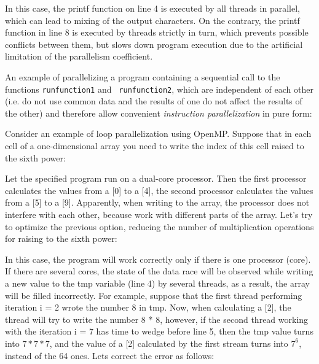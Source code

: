 {	\par In this case, the printf function on line 4 is executed by all threads in parallel, which can lead to mixing of the output characters. On the contrary, the printf function in line 8 is executed by threads strictly in turn, which prevents possible conflicts between them, but slows down program execution due to the artificial limitation of the parallelism coefficient.
	\par An example of parallelizing a program containing a sequential call to the functions \texttt{run\textunderscore function1} and \texttt{ run\textunderscore function2}, which are independent of each other (i.e. do not use common data and the results of one do not affect the results of the other) and therefore allow convenient \textit{instruction parallelization} in pure form:
	\begin{figure}[H]
		
	\end{figure}
	\par Consider an example of loop parallelization using OpenMP. Suppose that in each cell of a one-dimensional array you need to write the index of this cell raised to the sixth power:
	\begin{figure}[H]
		
	\end{figure}
	\par Let the specified program run on a dual-core processor. Then the first processor calculates the values from a [0] to a [4], the second processor calculates the values from a [5] to a [9]. Apparently, when writing to the array, the processor does not interfere with each other, because work with different parts of the array. Let's try to optimize the previous option, reducing the number of multiplication operations for raising to the sixth power:
	\begin{figure}[H]
		
	\end{figure}
	\par In this case, the program will work correctly only if there is one processor (core). If there are several cores, the state of the data race will be observed while writing a new value to the tmp variable (line 4) by several threads, as a result, the array will be filled incorrectly. For example, suppose that the first thread performing iteration i = 2 wrote the number 8 in tmp. Now, when calculating a [2], the thread will try to write the number 8 * 8, however, if the second thread working with the iteration i = 7 has time to wedge before line 5, then the tmp value turns into $7 * 7 * 7$, and the value of a [2] calculated by the first stream turns into $ 7 ^ 6 $, instead of the 64 ones. Lets correct the error as follows:
}
